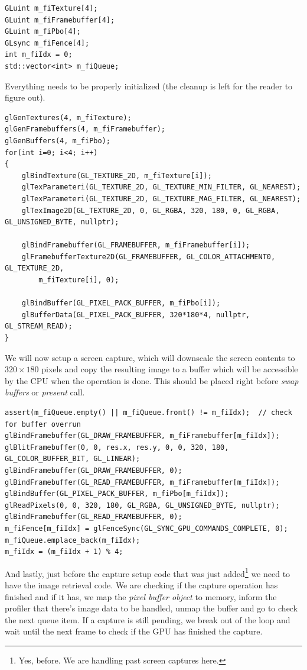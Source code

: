 \documentclass[hidelinks,titlepage,a4paper]{article}
\begin{document}
\begin{lstlisting}
GLuint m_fiTexture[4];
GLuint m_fiFramebuffer[4];
GLuint m_fiPbo[4];
GLsync m_fiFence[4];
int m_fiIdx = 0;
std::vector<int> m_fiQueue;
\end{lstlisting}

Everything needs to be properly initialized (the cleanup is left for the reader to figure out).

\begin{lstlisting}
glGenTextures(4, m_fiTexture);
glGenFramebuffers(4, m_fiFramebuffer);
glGenBuffers(4, m_fiPbo);
for(int i=0; i<4; i++)
{
    glBindTexture(GL_TEXTURE_2D, m_fiTexture[i]);
    glTexParameteri(GL_TEXTURE_2D, GL_TEXTURE_MIN_FILTER, GL_NEAREST);
    glTexParameteri(GL_TEXTURE_2D, GL_TEXTURE_MAG_FILTER, GL_NEAREST);
    glTexImage2D(GL_TEXTURE_2D, 0, GL_RGBA, 320, 180, 0, GL_RGBA, GL_UNSIGNED_BYTE, nullptr);

    glBindFramebuffer(GL_FRAMEBUFFER, m_fiFramebuffer[i]);
    glFramebufferTexture2D(GL_FRAMEBUFFER, GL_COLOR_ATTACHMENT0, GL_TEXTURE_2D,
		m_fiTexture[i], 0);

    glBindBuffer(GL_PIXEL_PACK_BUFFER, m_fiPbo[i]);
    glBufferData(GL_PIXEL_PACK_BUFFER, 320*180*4, nullptr, GL_STREAM_READ);
}
\end{lstlisting}

We will now setup a screen capture, which will downscale the screen contents to $320\times180$ pixels and copy the resulting image to a buffer which will be accessible by the CPU when the operation is done. This should be placed right before \emph{swap buffers} or \emph{present} call.

\begin{lstlisting}
assert(m_fiQueue.empty() || m_fiQueue.front() != m_fiIdx);	// check for buffer overrun
glBindFramebuffer(GL_DRAW_FRAMEBUFFER, m_fiFramebuffer[m_fiIdx]);
glBlitFramebuffer(0, 0, res.x, res.y, 0, 0, 320, 180, GL_COLOR_BUFFER_BIT, GL_LINEAR);
glBindFramebuffer(GL_DRAW_FRAMEBUFFER, 0);
glBindFramebuffer(GL_READ_FRAMEBUFFER, m_fiFramebuffer[m_fiIdx]);
glBindBuffer(GL_PIXEL_PACK_BUFFER, m_fiPbo[m_fiIdx]);
glReadPixels(0, 0, 320, 180, GL_RGBA, GL_UNSIGNED_BYTE, nullptr);
glBindFramebuffer(GL_READ_FRAMEBUFFER, 0);
m_fiFence[m_fiIdx] = glFenceSync(GL_SYNC_GPU_COMMANDS_COMPLETE, 0);
m_fiQueue.emplace_back(m_fiIdx);
m_fiIdx = (m_fiIdx + 1) % 4;
\end{lstlisting}

And lastly, just before the capture setup code that was just added\footnote{Yes, before. We are handling past screen captures here.} we need to have the image retrieval code. We are checking if the capture operation has finished and if it has, we map the \emph{pixel buffer object} to memory, inform the profiler that there's image data to be handled, unmap the buffer and go to check the next queue item. If a capture is still pending, we break out of the loop and wait until the next frame to check if the GPU has finished the capture.
\end{document}
